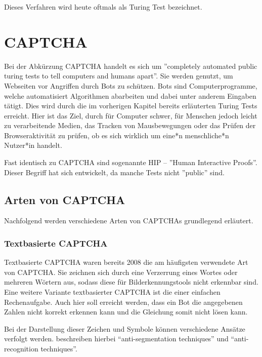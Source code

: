 Dieses Verfahren wird heute oftmals als Turing Test bezeichnet. 

\section{CAPTCHA}
\label{ch:basics:captcha}
Bei der Abkürzung CAPTCHA handelt es sich um ''completely automated public turing tests to tell computers and humans apart''. 
Sie werden genutzt, um Webseiten vor Angriffen durch Bots zu schützen. 
Bots sind Computerprogramme, welche automatisiert Algorithmen abarbeiten und dabei unter anderem Eingaben tätigt.
Dies wird durch die im vorherigen Kapitel bereits erläuterten Turing Tests erreicht. 
Hier ist das Ziel, durch für Computer schwer, für Menschen jedoch leicht zu verarbeitende Medien, das Tracken von Mausbewegungen
oder das Prüfen der Browseraktivität zu prüfen, ob es sich wirklich um eine*n menschliche*n Nutzer*in handelt.

Fast identisch zu CAPTCHA sind sogenannte HIP – ''Human Interactive Proofs''. 
Dieser Begriff hat sich entwickelt, da manche Tests nicht ''public'' sind. \cite[p.1]{chellapilla} \cite{tutorial} 

\subsection{Arten von CAPTCHA}
\label{ch:basics:captcha:arten}
Nachfolgend werden verschiedene Arten von CAPTCHAs grundlegend erläutert.
\subsubsection*{Textbasierte CAPTCHA}
Textbasierte CAPTCHA waren bereits 2008 die am häufigsten verwendete Art von CAPTCHA.
Sie zeichnen sich durch eine Verzerrung eines Wortes oder mehreren Wörtern aus, sodass diese für Bilderkennungstools nicht erkennbar sind.
Eine weitere Variante textbasierter CAPTCHA ist die einer einfachen Rechenaufgabe. 
Auch hier soll erreicht werden, dass ein Bot die angegebenen Zahlen nicht korrekt erkennen kann und die Gleichung somit nicht lösen kann. \cite{usabilityofcaptchas} \cite[p.75]{surveyofresearch} \cite{shinde2018DIFFERENTTO} %

Bei der Darstellung dieser Zeichen und Symbole können verschiedene Ansätze verfolgt werden.
\citeauthor{surveyofresearch} beschreiben hierbei ``anti-segmentation techniques'' und ``anti-recognition techniques''. \cite[p.76]{surveyofresearch}

